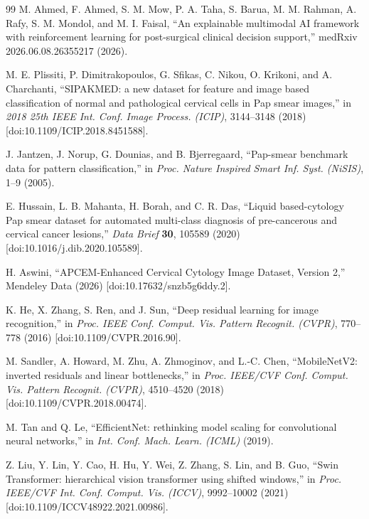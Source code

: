 \documentclass[12pt,letterpaper]{article}
\begin{document}
{\begin{thebibliography}{99}
M. Ahmed, F. Ahmed, S. M. Mow, P. A. Taha, S. Barua, M. M. Rahman, A. Rafy, S. M. Mondol, and M. I. Faisal, ``An explainable multimodal AI framework with reinforcement learning for post-surgical clinical decision support,'' medRxiv 2026.06.08.26355217 (2026).

M. E. Plissiti, P. Dimitrakopoulos, G. Sfikas, C. Nikou, O. Krikoni, and A. Charchanti, ``SIPAKMED: a new dataset for feature and image based classification of normal and pathological cervical cells in Pap smear images,'' in \textit{2018 25th IEEE Int. Conf. Image Process. (ICIP)}, 3144--3148 (2018) [doi:10.1109/ICIP.2018.8451588].

J. Jantzen, J. Norup, G. Dounias, and B. Bjerregaard, ``Pap-smear benchmark data for pattern classification,'' in \textit{Proc. Nature Inspired Smart Inf. Syst. (NiSIS)}, 1--9 (2005).

E. Hussain, L. B. Mahanta, H. Borah, and C. R. Das, ``Liquid based-cytology Pap smear dataset for automated multi-class diagnosis of pre-cancerous and cervical cancer lesions,'' \textit{Data Brief} \textbf{30}, 105589 (2020) [doi:10.1016/j.dib.2020.105589].

H. Aswini, ``APCEM-Enhanced Cervical Cytology Image Dataset, Version 2,'' Mendeley Data (2026) [doi:10.17632/snzb5g6ddy.2].

K. He, X. Zhang, S. Ren, and J. Sun, ``Deep residual learning for image recognition,'' in \textit{Proc. IEEE Conf. Comput. Vis. Pattern Recognit. (CVPR)}, 770--778 (2016) [doi:10.1109/CVPR.2016.90].

M. Sandler, A. Howard, M. Zhu, A. Zhmoginov, and L.-C. Chen, ``MobileNetV2: inverted residuals and linear bottlenecks,'' in \textit{Proc. IEEE/CVF Conf. Comput. Vis. Pattern Recognit. (CVPR)}, 4510--4520 (2018) [doi:10.1109/CVPR.2018.00474].

M. Tan and Q. Le, ``EfficientNet: rethinking model scaling for convolutional neural networks,'' in \textit{Int. Conf. Mach. Learn. (ICML)} (2019).

Z. Liu, Y. Lin, Y. Cao, H. Hu, Y. Wei, Z. Zhang, S. Lin, and B. Guo, ``Swin Transformer: hierarchical vision transformer using shifted windows,'' in \textit{Proc. IEEE/CVF Int. Conf. Comput. Vis. (ICCV)}, 9992--10002 (2021) [doi:10.1109/ICCV48922.2021.00986].


\end{thebibliography}}
\end{document}
